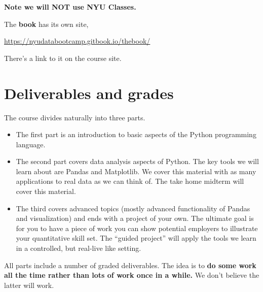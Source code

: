\textbf{Note we will NOT use NYU Classes.}

The {\bf book\/} has its own site,
\vspace{-0.15in}
\begin{center}
\url{https://nyudatabootcamp.gitbook.io/thebook/}
\end{center}
\vspace{-0.15in}
%
There's a link to it on the course site.

\section*{Deliverables and grades}

The course divides naturally into three parts.
\begin{itemize}
\item The first part is an introduction to basic aspects of the Python programming language.
\item The second part covers data analysis aspects of Python. The key tools we will learn about are Pandas and Matplotlib. We cover this material with as many applications to real data as we can think of.  The take home midterm will cover this material.
\item The third covers advanced topics (mostly advanced functionality of Pandas and visualization) and ends with a project of your own. The ultimate goal is for you to have a piece of work you can show potential employers to illustrate your quantitative skill set. The ``guided project'' will apply the tools we learn in a controlled, but real-live like setting.
\end{itemize}
All parts include a number of graded deliverables. The idea is to {\bf do some work all the time rather than lots of work once in a while.} We don't believe the latter will work.

